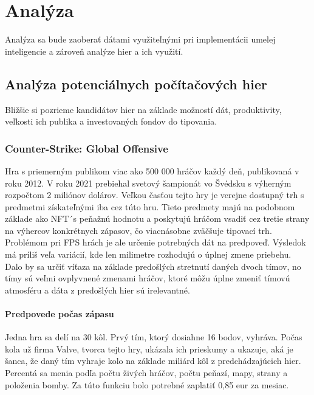 
\chapter{Analýza}

Analýza sa bude zaoberať dátami využiteľnými pri implementácii umelej inteligencie a zároveň analýze hier a ich využití.

\section{Analýza potenciálnych počítačových hier}
Bližšie si pozrieme kandidátov hier na základe možností dát, produktivity, veľkosti ich publika a investovaných fondov do tipovania.

\subsection{Counter-Strike: Global Offensive}
Hra s priemerným publikom viac ako 500 000 hráčov každý deň, publikovaná v roku 2012.\cite{csgoplayers} V roku 2021 prebiehal svetový šampionát vo Švédsku s výherným rozpočtom 2 miliónov dolárov. Veľkou časťou tejto hry je verejne dostupný trh s predmetmi získateľnými iba cez túto hru. Tieto predmety majú na podobnom základe ako NFT´s peňažnú hodnotu a poskytujú hráčom vsadiť cez tretie strany na výhercov konkrétnych zápasov, čo viacnásobne zväčšuje tipovací trh. Problémom pri FPS hrách je ale určenie potrebných dát na predpoveď. Výsledok má príliš veľa variácií, kde len milimetre rozhodujú o úplnej zmene priebehu. Dalo by sa určiť víťaza na základe predošlých stretnutí daných dvoch tímov, no tímy sú veľmi ovplyvnené zmenami hráčov, ktoré môžu úplne zmeniť tímovú atmosféru a dáta z predošlých hier sú irelevantné.

 \subsubsection{Predpovede počas zápasu}
 Jedna hra sa delí na 30 kôl. Prvý tím, ktorý dosiahne 16 bodov, vyhráva. Počas kola už firma Valve, tvorca tejto hry, ukázala ich prieskumy a ukazuje, aká je šanca, že daný tím vyhraje kolo na základe miliárd kôl z predchádzajúcich hier. Percentá sa menia podľa počtu živých hráčov, počtu peňazí, mapy, strany a položenia bomby. Za túto funkciu bolo potrebné zaplatiť 0,85 eur za mesiac.
